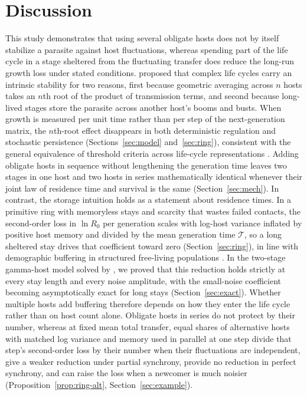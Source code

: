 \section{Discussion}\label{sec:disc}

This study demonstrates that using several obligate hosts does not by itself stabilize a parasite against host fluctuations, whereas spending part of the life cycle in a stage sheltered from the fluctuating transfer does reduce the long-run growth loss under stated conditions. \citet{dobson2020} proposed that complex life cycles carry an intrinsic stability for two reasons, first because geometric averaging across $n$ hosts takes an $n$th root of the product of transmission terms, and second because long-lived stages store the parasite across another host's booms and busts. When growth is measured per unit time rather than per step of the next-generation matrix, the $n$th-root effect disappears in both deterministic regulation and stochastic persistence (Sections~\ref{sec:model} and~\ref{sec:ring}), consistent with the general equivalence of threshold criteria across life-cycle representations \citep{rueffler2013}. Adding obligate hosts in sequence without lengthening the generation time leaves two stages in one host and two hosts in series mathematically identical whenever their joint law of residence time and survival is the same (Section~\ref{sec:mech}). In contrast, the storage intuition holds as a statement about residence times. In a primitive ring with memoryless stays and scarcity that wastes failed contacts, the second-order loss in $\ln R_0$ per generation scales with log-host variance inflated by positive host memory and divided by the mean generation time $\mathcal{T}$, so a long sheltered stay drives that coefficient toward zero (Section~\ref{sec:ring}), in line with demographic buffering in structured free-living populations \citep{tuljapurkar1982a,tuljapurkar1990,morris2008,jonsson2021}. In the two-stage gamma-host model solved by \citet{roerdink1988}, we proved that this reduction holds strictly at every stay length and every noise amplitude, with the small-noise coefficient becoming asymptotically exact for long stays (Section~\ref{sec:exact}). Whether multiple hosts add buffering therefore depends on how they enter the life cycle rather than on host count alone. Obligate hosts in series do not protect by their number, whereas at fixed mean total transfer, equal shares of alternative hosts with matched log variance and memory used in parallel at one step divide that step's second-order loss by their number when their fluctuations are independent, give a weaker reduction under partial synchrony, provide no reduction in perfect synchrony, and can raise the loss when a newcomer is much noisier (Proposition~\ref{prop:ring-alt}, Section~\ref{sec:example}).

